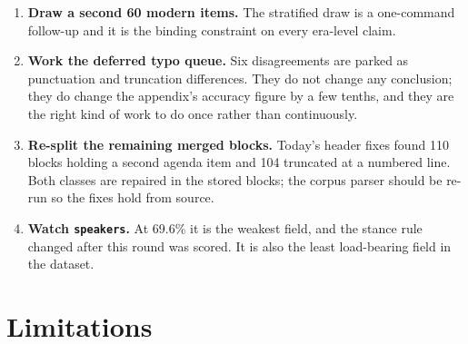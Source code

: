 \documentclass[11pt]{article}
\begin{document}
\begin{enumerate}
\item \textbf{Draw a second 60 modern items.} The stratified draw is a one-command follow-up
and it is the binding constraint on every era-level claim.
\item \textbf{Work the deferred typo queue.} Six disagreements are parked as punctuation and
truncation differences. They do not change any conclusion; they do change the appendix's
accuracy figure by a few tenths, and they are the right kind of work to do once rather than
continuously.
\item \textbf{Re-split the remaining merged blocks.} Today's header fixes found 110 blocks
holding a second agenda item and 104 truncated at a numbered line. Both classes are repaired
in the stored blocks; the corpus parser should be re-run so the fixes hold from source.
\item \textbf{Watch \texttt{speakers}.} At 69.6\% it is the weakest field, and the stance rule
changed after this round was scored. It is also the least load-bearing field in the dataset.
\end{enumerate}

\section{Limitations}
\end{document}
